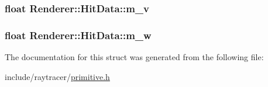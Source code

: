 \subsubsection[{m\+\_\+v}]{\setlength{\rightskip}{0pt plus 5cm}float Renderer\+::\+Hit\+Data\+::m\+\_\+v}\label{structRenderer_1_1HitData_a025e748b1c3e95f989128cf6c3b8f5c8}
\hypertarget{structRenderer_1_1HitData_a9d85ba822c1cc07983e5c00e457178d9}{}
\subsubsection[{m\+\_\+w}]{\setlength{\rightskip}{0pt plus 5cm}float Renderer\+::\+Hit\+Data\+::m\+\_\+w}\label{structRenderer_1_1HitData_a9d85ba822c1cc07983e5c00e457178d9}


The documentation for this struct was generated from the following file\+:\begin{DoxyCompactItemize}
\item 
include/raytracer/\hyperlink{primitive_8h}{primitive.\+h}\end{DoxyCompactItemize}
